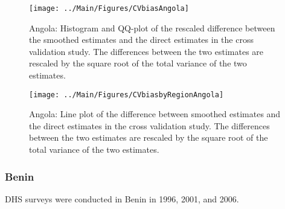 \documentclass[12pt]{article}\usepackage[]{graphicx}\usepackage[]{color}
\newenvironment{knitrout}{}{} %
\begin{document}
\begin{knitrout}
\color{fgcolor}\begin{figure}[bht]

{\centering \texttt{[image: ../Main/Figures/CVbiasAngola]} 

}

\caption[Angola]{Angola: Histogram and QQ-plot of the rescaled difference between the smoothed estimates and the direct estimates in the cross validation study. The differences between the two estimates are rescaled by the square root of the total variance of the two estimates.}\label{fig:unnamed-chunk-9}
\end{figure}


\end{knitrout}

\begin{knitrout}
\color{fgcolor}\begin{figure}[bht]

{\centering \texttt{[image: ../Main/Figures/CVbiasbyRegionAngola]} 

}

\caption[Angola]{Angola: Line plot of the difference between smoothed estimates and the direct estimates in the cross validation study. The differences between the two estimates are rescaled by the square root of the total variance of the two estimates.}\label{fig:unnamed-chunk-10}
\end{figure}


\end{knitrout}


\clearpage
\subsubsection{Benin}





DHS surveys were conducted in Benin in 1996, 2001, and 2006.
\end{document}

